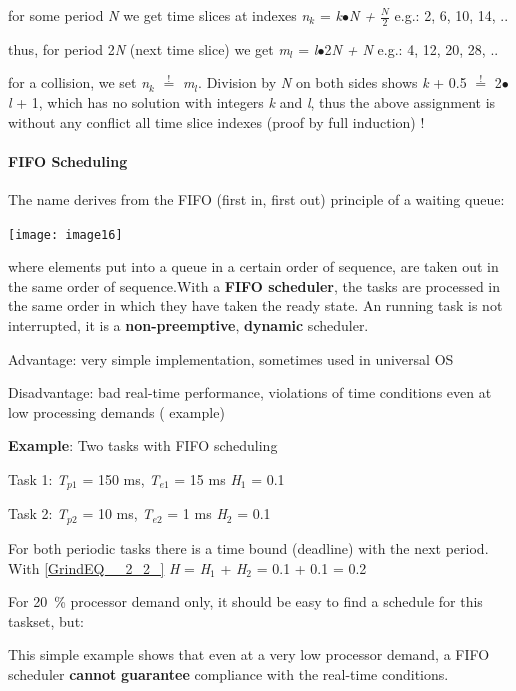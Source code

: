 for some period \textit{N} we get time slices at indexes  \textit{n${}_{k}$}  =  \textit{k$\bullet$N  +  $\frac{N}{2} $}  e.g.: 2, 6, 10, 14, ..

thus, for period 2\textit{N} (next time slice) we get    \textit{m${}_{l}$} =  \textit{l$\bullet$}2\textit{N  +  N  }e.g.: 4, 12, 20, 28, ..

for a collision, we set \textit{n${}_{k}$} ${\mathop{=}\limits^{!}} $ \textit{m${}_{l}$}. Division by \textit{N} on both sides shows \textit{k} + 0.5 ${\mathop{=}\limits^{!}} $ 2$\mathrm{\bullet}$\textit{l} + 1, which has no solution with integers \textit{k} and \textit{l}, thus the above assignment is without any conflict all time slice indexes (proof by full induction) !


\paragraph{  FIFO Scheduling}

The name derives from the FIFO (first in, first out) principle of a waiting queue:    

\texttt{[image: image16]}

where elements put into a queue in a certain order of sequence, are taken out in the same order of sequence.With a \textbf{FIFO scheduler}, the tasks are processed in the same order in which they have taken the ready state.  An running task is not interrupted, it is a \textbf{non-preemptive}, \textbf{dynamic} scheduler.

Advantage:   very simple implementation, sometimes used in universal OS

Disadvantage:  bad real-time performance,        violations of time conditions even at low processing demands ( example)


\textbf{Example}: Two tasks with FIFO scheduling

Task 1: \textit{T}${}_{p1}$ = 150 ms, \textit{T}${}_{e1}$ = 15 ms   \textit{H}${}_{1}$ = 0.1

Task 2: \textit{T}${}_{p2}$ = 10 ms,  \textit{T}${}_{e2}$ = 1 ms    \textit{H}${}_{2}$ = 0.1

For both periodic tasks there is a time bound (deadline) with the next period. With \eqref{GrindEQ__2_2_}   \textit{H} = \textit{H}${}_{1}$ + \textit{H}${}_{2}$ = 0.1 + 0.1 = 0.2 

For 20~\% processor demand only, it should be easy to find a schedule for this taskset, but:

This simple example shows that even at a very low processor demand, a FIFO scheduler \textbf{cannot} \textbf{guarantee} compliance with the real-time conditions.



